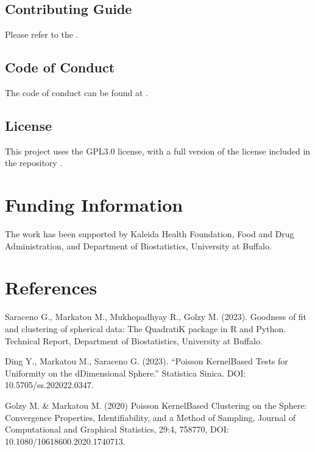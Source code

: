 \documentclass[letterpaper,10pt,english,openany,oneside]{sphinxmanual}
\begin{document}
{{{{\subsection{Contributing Guide}
\label{\detokenize{index:contributing-guide}}
\sphinxAtStartPar
Please refer to the .


\subsection{Code of Conduct}
\label{\detokenize{index:code-of-conduct}}
\sphinxAtStartPar
The code of conduct can be found at .


\subsection{License}
\label{\detokenize{index:license}}
\sphinxAtStartPar
This project uses the GPL\sphinxhyphen{}3.0 license, with a full version of the license included in the repository .


\section{Funding Information}
\label{\detokenize{index:funding-information}}
\sphinxAtStartPar
The work has been supported by Kaleida Health Foundation, Food and Drug Administration, and Department of Biostatistics, University at Buffalo.


\section{References}
\label{\detokenize{index:references}}
\sphinxAtStartPar
Saraceno G., Markatou M., Mukhopadhyay R., Golzy M. (2023). Goodness of\sphinxhyphen{}
fit and clustering of spherical data: The QuadratiK package in R and Python. Technical Report, Department of Biostatistics, University at Buffalo.

\sphinxAtStartPar
Ding Y., Markatou M., Saraceno G. (2023). “Poisson Kernel\sphinxhyphen{}Based Tests for
Uniformity on the d\sphinxhyphen{}Dimensional Sphere.” Statistica Sinica. DOI: 10.5705/ss.202022.0347.

\sphinxAtStartPar
Golzy M. \& Markatou M. (2020) Poisson Kernel\sphinxhyphen{}Based Clustering on the Sphere:
Convergence Properties, Identifiability, and a Method of Sampling, Journal of Computational and
Graphical Statistics, 29:4, 758\sphinxhyphen{}770, DOI: 10.1080/10618600.2020.1740713.

}}}}
\end{document}
